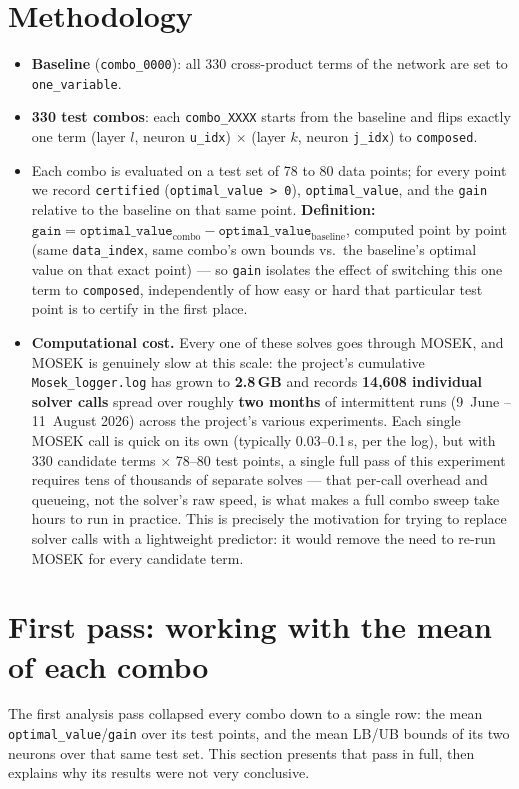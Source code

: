 \documentclass[11pt,a4paper]{article}
\begin{document}
\section{Methodology}
\begin{itemize}
  \item \textbf{Baseline} (\texttt{combo\_0000}): all 330 cross-product terms of the network are set to \texttt{one\_variable}.
  \item \textbf{330 test combos}: each \texttt{combo\_XXXX} starts from the baseline and flips exactly one term (layer $l$, neuron \texttt{u\_idx}) $\times$ (layer $k$, neuron \texttt{j\_idx}) to \texttt{composed}.
  \item Each combo is evaluated on a test set of 78 to 80 data points; for every point we record \texttt{certified} (\texttt{optimal\_value > 0}), \texttt{optimal\_value}, and the \texttt{gain} relative to the baseline on that same point. \textbf{Definition:} $\texttt{gain} = \texttt{optimal\_value}_{\text{combo}} - \texttt{optimal\_value}_{\text{baseline}}$, computed point by point (same \texttt{data\_index}, same combo's own bounds vs.\ the baseline's optimal value on that exact point) --- so \texttt{gain} isolates the effect of switching this one term to \texttt{composed}, independently of how easy or hard that particular test point is to certify in the first place.
  \item \textbf{Computational cost.} Every one of these solves goes through MOSEK, and MOSEK is genuinely slow at this scale: the project's cumulative \texttt{Mosek\_logger.log} has grown to \textbf{2.8\,GB} and records \textbf{14{,}608 individual solver calls} spread over roughly \textbf{two months} of intermittent runs (9~June -- 11~August 2026) across the project's various experiments. Each single MOSEK call is quick on its own (typically 0.03--0.1\,s, per the log), but with 330 candidate terms $\times$ 78--80 test points, a single full pass of this experiment requires tens of thousands of separate solves --- that per-call overhead and queueing, not the solver's raw speed, is what makes a full combo sweep take hours to run in practice. This is precisely the motivation for trying to replace solver calls with a lightweight predictor: it would remove the need to re-run MOSEK for every candidate term.
\end{itemize}

\section{First pass: working with the mean of each combo}
The first analysis pass collapsed every combo down to a single row: the mean \texttt{optimal\_value}/\texttt{gain} over its test points, and the mean LB/UB bounds of its two neurons over that same test set. This section presents that pass in full, then explains why its results were not very conclusive.
\end{document}
